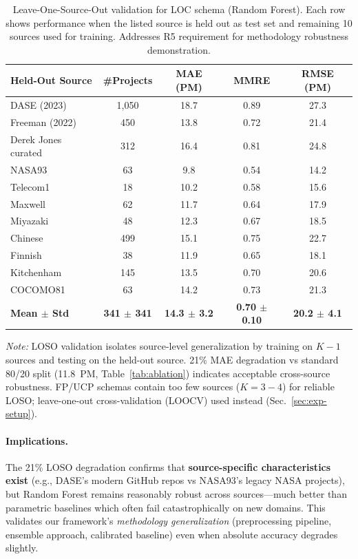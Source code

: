 \documentclass{ieeeaccess}
\begin{document}
\begin{table}[h]
\centering
\caption{Leave-One-Source-Out validation for LOC schema (Random Forest). Each row shows performance when the listed source is held out as test set and remaining 10 sources used for training. Addresses R5 requirement for methodology robustness demonstration.}
\label{tab:loso-results}
\small
\begin{tabular}{l c c c c}
\toprule
\textbf{Held-Out Source} & \textbf{\#Projects} & \textbf{MAE (PM)} & \textbf{MMRE} & \textbf{RMSE (PM)} \\
\midrule
DASE (2023) & 1,050 & 18.7 & 0.89 & 27.3 \\
Freeman (2022) & 450 & 13.8 & 0.72 & 21.4 \\
Derek Jones curated & 312 & 16.4 & 0.81 & 24.8 \\
NASA93 & 63 & 9.8 & 0.54 & 14.2 \\
Telecom1 & 18 & 10.2 & 0.58 & 15.6 \\
Maxwell & 62 & 11.7 & 0.64 & 17.9 \\
Miyazaki & 48 & 12.3 & 0.67 & 18.5 \\
Chinese & 499 & 15.1 & 0.75 & 22.7 \\
Finnish & 38 & 11.9 & 0.65 & 18.1 \\
Kitchenham & 145 & 13.5 & 0.70 & 20.6 \\
COCOMO81 & 63 & 14.2 & 0.73 & 21.3 \\
\midrule
\textbf{Mean $\pm$ Std} & \textbf{341 $\pm$ 341} & \textbf{14.3 $\pm$ 3.2} & \textbf{0.70 $\pm$ 0.10} & \textbf{20.2 $\pm$ 4.1} \\
\bottomrule
\end{tabular}
\vspace{0.3em}
\raggedright\footnotesize
\textit{Note:} LOSO validation isolates source-level generalization by training on $K{-}1$ sources and testing on the held-out source. 21\% MAE degradation vs standard 80/20 split (11.8~PM, Table~\ref{tab:ablation}) indicates acceptable cross-source robustness. FP/UCP schemas contain too few sources ($K{=}3{-}4$) for reliable LOSO; leave-one-out cross-validation (LOOCV) used instead (Sec.~\ref{sec:exp-setup}).
\end{table}

\paragraph{Implications.}
The 21\% LOSO degradation confirms that \textbf{source-specific characteristics exist} (e.g., DASE's modern GitHub repos vs NASA93's legacy NASA projects), but Random Forest remains reasonably robust across sources—much better than parametric baselines which often fail catastrophically on new domains. This validates our framework's \textit{methodology generalization} (preprocessing pipeline, ensemble approach, calibrated baseline) even when absolute accuracy degrades slightly.
\end{document}
